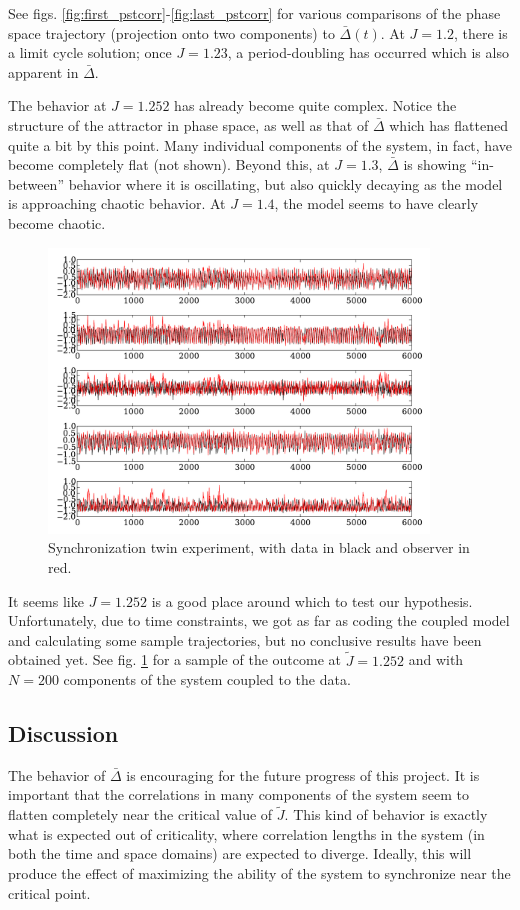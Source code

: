 \documentclass{article} %
\begin{document}
See figs. \ref{fig:first_pstcorr}-\ref{fig:last_pstcorr} for various comparisons of the phase space trajectory (projection onto two components) to $\bar{\Delta}(t)$.  At $J=1.2$, there is a limit cycle solution; once $J=1.23$, a period-doubling has occurred which is also apparent in $\bar{\Delta}$.

The behavior at $J=1.252$ has already become quite complex.  Notice the structure of the attractor in phase space, as well as that of $\bar{\Delta}$ which has flattened quite a bit by this point. Many individual components of the system, in fact, have become completely flat (not shown).  Beyond this, at $J=1.3$, $\bar{\Delta}$ is showing ``in-between'' behavior where it is oscillating, but also quickly decaying as the model is approaching chaotic behavior.  At $J=1.4$, the model seems to have clearly become chaotic.

\begin{figure}[p]
	\centering
	\includegraphics[width=0.9\textwidth]{paul_figs/sync_J_1_252_g_0_3}
	\caption{Synchronization twin experiment, with data in black and observer in red.}
	\label{fig:twinex}
\end{figure}

It seems like $J=1.252$ is a good place around which to test our hypothesis.  Unfortunately, due to time constraints, we got as far as coding the coupled model and calculating some sample trajectories, but no conclusive results have been obtained yet. See fig. \ref{fig:twinex} for a sample of the outcome at $\tilde{J}=1.252$ and with $N=200$ components of the system coupled to the data.

\subsection{Discussion}
The behavior of $\bar{\Delta}$ is encouraging for the future progress of this project.  It is important that the correlations in many components of the system seem to flatten completely near the critical value of $\tilde{J}$.  This kind of behavior is exactly what is expected out of criticality, where correlation lengths in the system (in both the time and space domains) are expected to diverge.  Ideally, this will produce the effect of maximizing the ability of the system to synchronize near the critical point.
\end{document}
